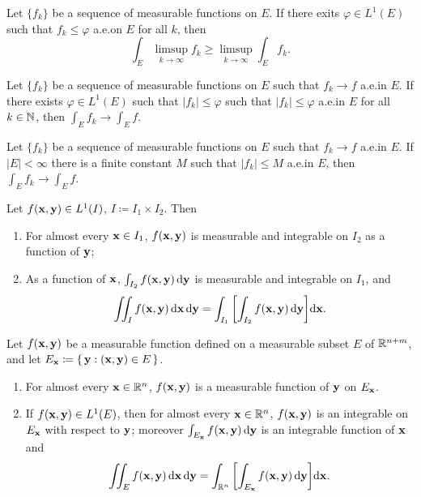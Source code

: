 \begin{corollary*}
Let $\{f_k\}$ be a sequence of measurable functions on $E$. If there exits
$\varphi\in L^1(E)$ such that $f_k\leq\varphi$ a.e.\@ on $E$ for all $k$,
then
\[
\int_E\limsup_{k\to\infty} f_k\geq\limsup_{k\to\infty}\int_E f_k.
\]
\end{corollary*}
\begin{theorem*}
Let $\{f_k\}$ be a sequence of measurable functions on $E$ such that
$f_k\to f$ a.e.\@ in $E$. If there exists $\varphi\in L^1(E)$ such that
$|f_k|\leq\varphi$  such that $|f_k|\leq\varphi$ a.e.\@ in $E$ for all
$k\in\mathbb{N}$, then $\int_E f_k\to\int_E f$.
\end{theorem*}
\begin{corollary*}
Let $\{f_k\}$ be a sequence of measurable functions on $E$ such  that
$f_k\to f$ a.e.\@ in $E$. If $|E|<\infty$ there is a finite constant $M$
such that $|f_k|\leq M$ a.e.\@ in $E$, then $\int_E f_k\to\int_E f$.
\end{corollary*}
\begin{theorem*}
Let $f(\mathbf{x},\mathbf{y})\in L^1(I)$, $I\coloneqq I_1\times I_2$. Then
\begin{enumerate}[label=\textnormal{(\roman*)}]
\item For almost every $\mathbf{x}\in I_1$, $f(\mathbf{x},\mathbf{y})$ is measurable and
  integrable on $I_2$ as a function of $\mathbf{y}$;
\item As a function of $\mathbf{x}$, $\int_{I_2} f(\mathbf{x},\mathbf{y})\mathop{}\!\mathrm{d}\mathbf{y}$ is
  measurable and integrable on $I_1$, and
\[
\iint_I f(\mathbf{x},\mathbf{y})\mathop{}\!\mathrm{d}\mathbf{x}\mathop{}\!\mathrm{d}\mathbf{y}=
\int_{I_1}\left[\int_{I_2}f(\mathbf{x},\mathbf{y})\mathop{}\!\mathrm{d}\mathbf{y}\right]\!\mathop{}\!\mathrm{d}\mathbf{x}.
\]
\end{enumerate}
\end{theorem*}
\begin{theorem*}[6.8]
Let $f(\mathbf{x},\mathbf{y})$ be a measurable function defined on a measurable subset
$E$ of $\mathbb{R}^{n+m}$, and let $E_{\mathbf{x}}\coloneqq\left\{ \,\mathbf{y}:(\mathbf{x},\mathbf{y})\in
  E \,\right\}$.
\begin{enumerate}[label=\textnormal{(\roman*)}]
\item For almost every $\mathbf{x}\in \mathbb{R}^n$, $f(\mathbf{x},\mathbf{y})$ is a measurable
  function of $\mathbf{y}$ on $E_{\mathbf{x}}$.
\item If $f(\mathbf{x},\mathbf{y})\in L^1(E)$, then for almost every $\mathbf{x}\in\mathbb{R}^n$,
  $f(\mathbf{x},\mathbf{y})$ is an integrable on $E_{\mathbf{x}}$ with respect to $\mathbf{y}$;
  moreover $\int_{E_{\mathbf{x}}}f(\mathbf{x},\mathbf{y})\mathop{}\!\mathrm{d}\mathbf{y}$ is an integrable function
  of $\mathbf{x}$ and
\[
\iint_E f(\mathbf{x},\mathbf{y})\mathop{}\!\mathrm{d}\mathbf{x}\mathop{}\!\mathrm{d}\mathbf{y}=\int_{\mathbb{R}^n}\left[\int_{E_{\mathbf{x}}}f(\mathbf{x},\mathbf{y})\mathop{}\!\mathrm{d}\mathbf{y}\right]\!\mathop{}\!\mathrm{d}\mathbf{x}.
\]
\end{enumerate}
\end{theorem*}
